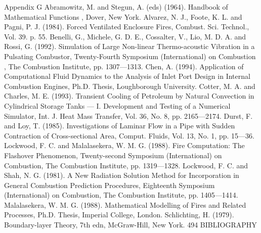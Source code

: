 \documentclass[11pt,a4paper,openany,fontset=none]{ctexbook}
\begin{document}
\begin{sloppypar}
{\small Appendix G Abramowitz, M. and Stegun, A. (eds) (1964). Handbook of Mathematical Functions , Dover, New York. Alvarez, N. J., Foote, K. L. and Pagni, P. J. (1984). Forced Ventilated Enclosure Fires, Combust. Sci. Technol., Vol. 39. p. 55. Benelli, G., Michele, G. D. E., Cossalter, V., Lio, M. D. A. and Rossi, G. (1992). Simulation of Large Non-linear Thermo-acoustic Vibration in a Pulsating Combustor, Twenty-Fourth Symposium (International) on Combustion , The Combustion Institute, pp. 1307—1313. Chen, A. (1994). Application of Computational Fluid Dynamics to the Analysis of Inlet Port Design in Internal Combustion Engines, Ph.D. Thesis, Loughborough University. Cotter, M. A. and Charles, M. E. (1993). Transient Cooling of Petroleum by Natural Convection in Cylindrical Storage Tanks — I. Development and Testing of a Numerical Simulator, Int. J. Heat Mass Transfer, Vol. 36, No. 8, pp. 2165—2174. Durst, F. and Loy, T. (1985). Investigations of Laminar Flow in a Pipe with Sudden Contraction of Cross-sectional Area, Comput. Fluids, Vol. 13, No. 1, pp. 15—36. Lockwood, F. C. and Malalasekera, W. M. G. (1988). Fire Computation: The Flashover Phenomenon, Twenty-second Symposium (International) on Combustion, The Combustion Institute, pp. 1319—1328. Lockwood, F. C. and Shah, N. G. (1981). A New Radiation Solution Method for Incorporation in General Combustion Prediction Procedures, Eighteenth Symposium (International) on Combustion, The Combustion Institute, pp. 1405—1414. Malalasekera, W. M. G. (1988). Mathematical Modelling of Fires and Related Processes, Ph.D. Thesis, Imperial College, London. Schlichting, H. (1979). Boundary-layer Theory, 7th edn, McGraw-Hill, New York. 494 BIBLIOGRAPHY}\par

\end{sloppypar}
\end{document}

